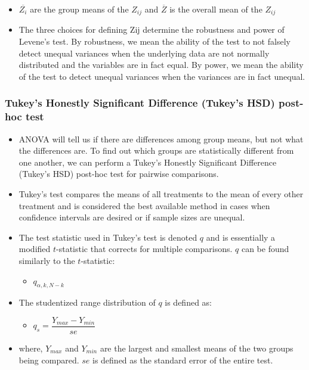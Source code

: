 \documentclass[a4paper]{article}
\begin{document}
\begin{itemize}
    \item[] $\overline{Z_i}$ are the group means of the $Z_{ij}$ and $\overline{Z}$ is the overall mean of the $Z_{ij}$
    
    \item[] The three choices for defining Zij determine the robustness and power of Levene's test. By robustness, we mean the ability of the test to not falsely detect unequal variances when the underlying data are not normally distributed and the variables are in fact equal. By power, we mean the ability of the test to detect unequal variances when the variances are in fact unequal.
\end{itemize}

\subsubsection{Tukey’s Honestly Significant Difference (Tukey’s HSD) post-hoc test}
\begin{itemize}
    \item[] ANOVA will tell us if there are differences among group means, but not what the differences are. To find out which groups are statistically different from one another, we can perform a Tukey’s Honestly Significant Difference (Tukey’s HSD) post-hoc test for pairwise comparisons.
    
    \item[] Tukey’s test compares the means of all treatments to the mean of every other treatment and is considered the best available method in cases when confidence intervals are desired or if sample sizes are unequal.
    
    \item[] The test statistic used in Tukey’s test is denoted $q$ and is essentially a modified $t$-statistic that corrects for multiple comparisons. $q$ can be found similarly to the $t$-statistic:
    \begin{itemize}
        \centering
        \large
        \item[] $q_{\alpha,k,N-k}$ 
    \end{itemize}
    
    \item[] The studentized range distribution of $q$ is defined as:
    \begin{itemize}
        \centering
        \large
        \item[] $q_s=\dfrac{Y_{max}-Y_{min}}{se}$ 
    \end{itemize}
    
    \item[] where, $Y_{max}$ and $Y_{min}$ are the largest and smallest means of the two groups being compared. $se$ is defined as the standard error of the entire test.
\end{itemize}
\end{document}
